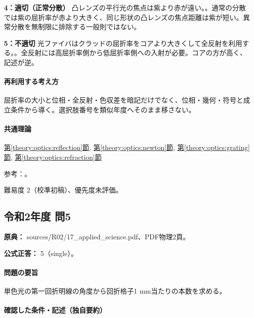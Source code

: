 \noindent\textbf{4：適切（正常分散）} 凸レンズの平行光の焦点は紫より赤が遠い。。通常の分散では紫の屈折率が赤より大きく、同じ形状の凸レンズの焦点距離は紫が短い。異常分散を無制限に排除する一般則ではない。\par

\noindent\textbf{5：不適切} 光ファイバはクラッドの屈折率をコアより大きくして全反射を利用する。。全反射には高屈折率側から低屈折率側への入射が必要。コアの方が高く、記述が逆。\par

\paragraph{再利用する考え方} 屈折率の大小と位相・全反射・色収差を暗記だけでなく、位相・幾何・符号と成立条件から導く。選択肢番号を類似年度へそのまま移さない。

\paragraph{共通理論} \hyperref[theory:optics:reflection]{第\ref*{theory:optics:reflection}節}, \hyperref[theory:optics:newton]{第\ref*{theory:optics:newton}節}, \hyperref[theory:optics:grating]{第\ref*{theory:optics:grating}節}, \hyperref[theory:optics:refraction]{第\ref*{theory:optics:refraction}節}

\par 参考：\cite{os_fiber,os_thinfilm,os_lens}。

\par 難易度 2（校準初稿）、優先度未評価。

\subsection{令和2年度 問5}
\label{q:r02-reg-applied-05}

\noindent\textbf{原典：} sources/R02/17\_applied\_science.pdf、PDF物理2頁。

\textbf{公式正答：} 5（single）。

\paragraph{問題の要旨} 単色光の第一回折明線の角度から回折格子1 mm当たりの本数を求める。

\paragraph{確認した条件・記述（独自要約）}\mbox{}\par

